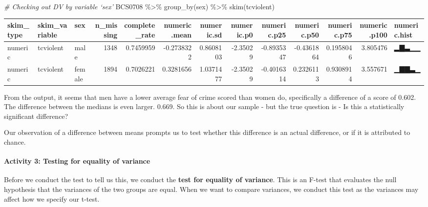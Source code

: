\documentclass[
]{book}
\newenvironment{Shaded}{\begin{snugshade}}{\end{snugshade}}
\newcommand{\CommentTok}[1]{\textcolor[rgb]{0.56,0.35,0.01}{\textit{#1}}}
\newcommand{\FunctionTok}[1]{\textcolor[rgb]{0.00,0.00,0.00}{#1}}
\newcommand{\NormalTok}[1]{#1}
\newcommand{\SpecialCharTok}[1]{\textcolor[rgb]{0.00,0.00,0.00}{#1}}
\begin{document}
\begin{Shaded}
\begin{Highlighting}[]
\CommentTok{\# Checking out DV by variable ‘sex’}
\NormalTok{BCS0708 }\SpecialCharTok{\%\textgreater{}\%} \FunctionTok{group\_by}\NormalTok{(sex) }\SpecialCharTok{\%\textgreater{}\%} \FunctionTok{skim}\NormalTok{(tcviolent)}
\end{Highlighting}
\end{Shaded}

\begin{tabular}{l|l|l|r|r|r|r|r|r|r|r|r|l}
\hline
skim\_type & skim\_variable & sex & n\_missing & complete\_rate & numeric.mean & numeric.sd & numeric.p0 & numeric.p25 & numeric.p50 & numeric.p75 & numeric.p100 & numeric.hist\\
\hline
numeric & tcviolent & male & 1348 & 0.7459959 & -0.2738322 & 0.8608103 & -2.35029 & -0.8935347 & -0.4361864 & 0.1958046 & 3.805476 & ▂▇▃▁▁\\
\hline
numeric & tcviolent & female & 1894 & 0.7026221 & 0.3281656 & 1.0371477 & -2.35029 & -0.4016314 & 0.2326113 & 0.9308914 & 3.557671 & ▁▇▇▃▁\\
\hline
\end{tabular}

From the output, it seems that men have a lower average fear of crime scored than women do, specifically a difference of a score of 0.602. The difference between the medians is even larger. 0.669. So this is about our sample - but the true question is - Is this a statistically significant difference?

Our observation of a difference between means prompts us to test whether this difference is an actual difference, or if it is attributed to chance.

\hypertarget{activity-3-testing-for-equality-of-variance}{%
\paragraph{Activity 3: Testing for equality of variance}\label{activity-3-testing-for-equality-of-variance}}

Before we conduct the test to tell us this, we conduct the \textbf{test for equality of variance}. This is an F-test that evaluates the null hypothesis that the variances of the two groups are equal. When we want to compare variances, we conduct this test as the variances may affect how we specify our t-test.

\begin{Shaded}
\end{Shaded}
\end{document}
